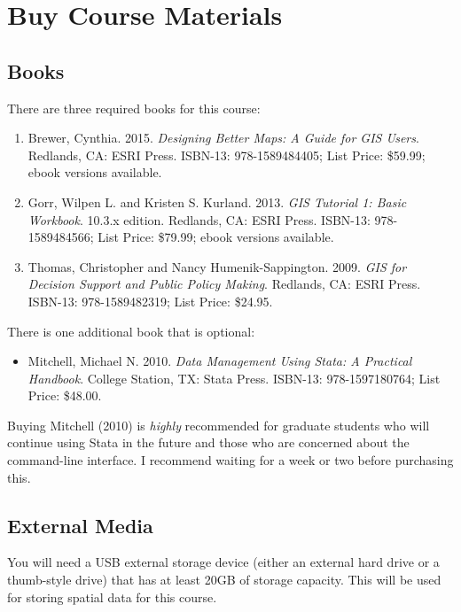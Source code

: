 \documentclass[]{book}
\providecommand{\tightlist}{%
  \setlength{\itemsep}{0pt}\setlength{\parskip}{0pt}}
\begin{document}
\section{Buy Course Materials}\label{buy-course-materials}

\subsection*{Books}\label{books}

There are three required books for this course:

\begin{enumerate}
\def\labelenumi{\arabic{enumi}.}
\tightlist
\item
  Brewer, Cynthia. 2015. \emph{Designing Better Maps: A Guide for GIS
  Users}. Redlands, CA: ESRI Press. ISBN-13: 978-1589484405; List Price:
  \$59.99; ebook versions available.
\item
  Gorr, Wilpen L. and Kristen S. Kurland. 2013. \emph{GIS Tutorial 1:
  Basic Workbook}. 10.3.x edition. Redlands, CA: ESRI Press. ISBN-13:
  978-1589484566; List Price: \$79.99; ebook versions available.
\item
  Thomas, Christopher and Nancy Humenik-Sappington. 2009. \emph{GIS for
  Decision Support and Public Policy Making}. Redlands, CA: ESRI Press.
  ISBN-13: 978-1589482319; List Price: \$24.95.
\end{enumerate}

There is one additional book that is optional:

\begin{itemize}
\tightlist
\item
  Mitchell, Michael N. 2010. \emph{Data Management Using Stata: A
  Practical Handbook}. College Station, TX: Stata Press. ISBN-13:
  978-1597180764; List Price: \$48.00.
\end{itemize}

Buying Mitchell (2010) is \emph{highly} recommended for graduate
students who will continue using Stata in the future and those who are
concerned about the command-line interface. I recommend waiting for a
week or two before purchasing this.

\subsection*{External Media}\label{external-media}

You will need a USB external storage device (either an external hard
drive or a thumb-style drive) that has at least 20GB of storage
capacity. This will be used for storing spatial data for this course.
\end{document}
